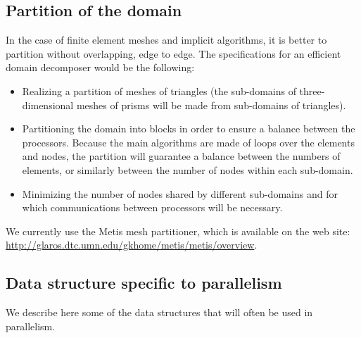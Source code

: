 \subsection{Partition of the domain}

In the case of finite element meshes and implicit algorithms, it is better to
partition without overlapping, edge to edge. The specifications for an
efficient domain decomposer would be the following:
\begin{itemize}
  \item Realizing a partition of meshes of triangles (the sub-domains of
    three-dimensional meshes of prisms will be made from sub-domains of
    triangles).
  \item Partitioning the domain into blocks in order to ensure a balance
    between the processors. Because the main algorithms are made of loops over
    the elements and nodes, the partition will guarantee a balance between the
    numbers of elements, or similarly between the number of nodes within each
    sub-domain.
  \item Minimizing the number of nodes shared by different sub-domains and for
    which communications between processors will be necessary.
\end{itemize}

We currently use the Metis mesh partitioner, which is available on the web
site: \url{http://glaros.dtc.umn.edu/gkhome/metis/metis/overview}.

\subsection{Data structure specific to parallelism}

We describe here some of the data structures that will often be used in
parallelism.

